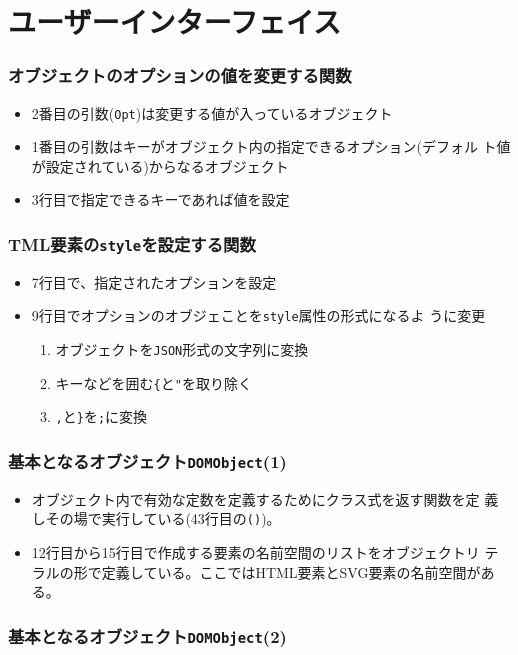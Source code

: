  \section{ユーザーインターフェイス}
 \begin{frame}[containsverbatim]
  \frametitle{オブジェクトのオプションの値を変更する関数}
\begin{itemize}
 \item 2番目の引数(\texttt{Opt})は変更する値が入っているオブジェクト
 \item 1番目の引数はキーがオブジェクト内の指定できるオプション(デフォル
       ト値が設定されている)からなるオブジェクト
 \item 3行目で指定できるキーであれば値を設定
\end{itemize}
 \end{frame}
 \begin{frame}[containsverbatim]
  \frametitle{TML要素の\texttt{style}を設定する関数}
\begin{itemize}
 \item 7行目で、指定されたオプションを設定
 \item 9行目でオプションのオブジェことを\texttt{style}属性の形式になるよ
       うに変更
\begin{enumerate}
 \item オブジェクトを\texttt{JSON}形式の文字列に変換
 \item キーなどを囲む\texttt{\{}と\texttt{"}を取り除く%
 \item \texttt{,}と\texttt{\}}を\texttt{;}に変換
\end{enumerate}
\end{itemize}
 \end{frame}
 \begin{frame}[containsverbatim]
  \frametitle{基本となるオブジェクト\texttt{DOMObject}(1)}
\begin{itemize}
 \item オブジェクト内で有効な定数を定義するためにクラス式を返す関数を定
       義しその場で実行している(43行目の\texttt{()})。
 \item 12行目から15行目で作成する要素の名前空間のリストをオブジェクトリ
       テラルの形で定義している。ここではHTML要素とSVG要素の名前空間があ
       る。
\end{itemize}
 \end{frame}
 \begin{frame}[containsverbatim]
  \frametitle{基本となるオブジェクト\texttt{DOMObject}(2)}
 \end{frame}
